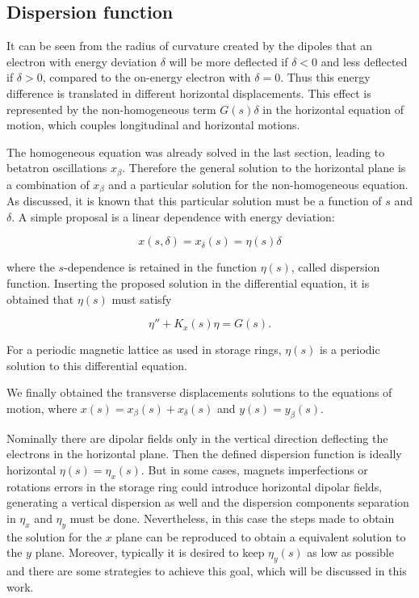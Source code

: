 \subsection{Dispersion function}

It can be seen from the radius of curvature created by the dipoles that an electron with energy deviation $\delta$ will be more deflected if $\delta < 0$ and less deflected if $\delta > 0$, compared to the on-energy electron with $\delta = 0$. Thus this energy difference is translated in different horizontal displacements. This effect is represented by the non-homogeneous term $G(s)\delta$ in the horizontal equation of motion, which couples longitudinal and horizontal motions.

The homogeneous equation was already solved in the last section, leading to betatron oscillations $x_{\beta}$. Therefore the general solution to the horizontal plane is a combination of $x_{\beta}$ and a particular solution for the non-homogeneous equation. As discussed, it is known that this particular solution must be a function of $s$ and $\delta$. A simple proposal is a linear dependence with energy deviation: 

\begin{equation}
    x(s, \delta) = x_{\delta}(s) = \eta(s) \delta
\end{equation}

where the $s$-dependence is retained in the function $\eta(s)$, called dispersion function. Inserting the proposed solution in the differential equation, it is obtained that $\eta(s)$ must satisfy

\begin{equation}
    \eta'' + K_x(s)\eta = G(s).
    \label{eq:dispersion}
\end{equation}

For a periodic magnetic lattice as used in storage rings, $\eta(s)$ is a periodic solution to this differential equation.

We finally obtained the transverse displacements solutions to the equations of motion, where $x(s) = x_{\beta}(s) + x_{\delta} (s)$ and $y(s) = y_{\beta}(s)$. 

Nominally there are dipolar fields only in the vertical direction deflecting the electrons in the horizontal plane. Then the defined dispersion function is ideally horizontal $\eta(s) = \eta_x(s)$. But in some cases, magnets imperfections or rotations errors in the storage ring could introduce horizontal dipolar fields, generating a vertical dispersion as well and the dispersion components separation in $\eta_x$ and $\eta_y$ must be done. Nevertheless, in this case the steps made to obtain the solution for the $x$ plane can be reproduced to obtain a equivalent solution to the $y$ plane. Moreover, typically it is desired to keep $\eta_y(s)$ as low as possible and there are some strategies to achieve this goal, which will be discussed in this work.

